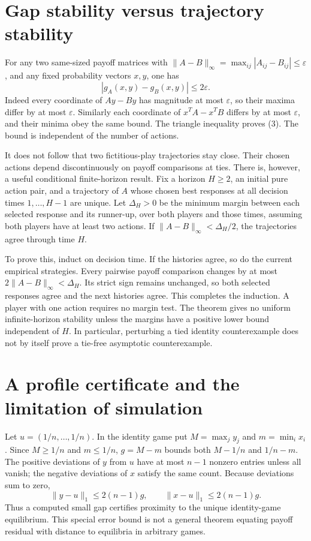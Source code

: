 \documentclass[11pt]{article}
\begin{document}
\section*{Gap stability versus trajectory stability}
For any two same-sized payoff matrices with
$\|A-B\|_\infty=\max_{ij}|A_{ij}-B_{ij}|\leq\varepsilon$, and any
fixed probability vectors $x,y$, one has
\[
                   |g_A(x,y)-g_B(x,y)|\leq2\varepsilon.           \tag{3}
\]
Indeed every coordinate of $Ay-By$ has magnitude at most
$\varepsilon$, so their maxima differ by at most $\varepsilon$.
Similarly each coordinate of $x^TA-x^TB$ differs by at most
$\varepsilon$, and their minima obey the same bound. The triangle
inequality proves (3). The bound is independent of the number of actions.

It does not follow that two fictitious-play trajectories stay close.
Their chosen actions depend discontinuously on payoff comparisons at
ties. There is, however, a useful conditional finite-horizon result.
Fix a horizon $H\geq2$, an initial pure action pair, and a trajectory
of $A$ whose chosen
best responses at all decision times $1,\ldots,H-1$ are unique. Let
$\Delta_H>0$ be the minimum margin between each selected response and
its runner-up, over both players and those times, assuming both players
have at least two actions. If
$\|A-B\|_\infty<\Delta_H/2$, the trajectories agree through time $H$.

To prove this, induct on decision time. If the histories agree, so do
the current empirical strategies. Every pairwise payoff comparison
changes by at most $2\|A-B\|_\infty<\Delta_H$. Its strict sign remains
unchanged, so both selected responses agree and the next histories
agree. This completes the induction. A player with one action requires
no margin test. The theorem gives no uniform infinite-horizon stability
unless the margins have a positive lower bound independent of $H$.
In particular, perturbing a tied identity counterexample does not
by itself prove a tie-free asymptotic counterexample.

\section*{A profile certificate and the limitation of simulation}
Let $u=(1/n,\ldots,1/n)$. In the identity game put
$M=\max_jy_j$ and $m=\min_ix_i$. Since $M\geq1/n$ and $m\leq1/n$,
$g=M-m$ bounds both $M-1/n$ and $1/n-m$. The positive deviations of $y$
from $u$ have at most $n-1$ nonzero entries unless all vanish; the negative
deviations of $x$ satisfy the same count. Because deviations sum to zero,
\[
              \|y-u\|_1\leq2(n-1)g,
              \qquad\|x-u\|_1\leq2(n-1)g.                       \tag{4}
\]
Thus a computed small gap certifies proximity to the unique identity-game
equilibrium. This special error bound is not a general theorem equating
payoff residual with distance to equilibria in arbitrary games.
\end{document}
